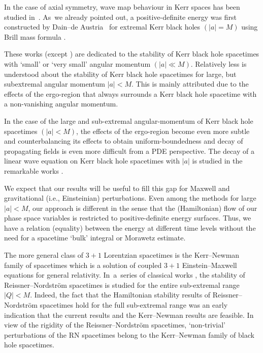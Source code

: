 In the case of axial symmetry, wave map behaviour in Kerr spaces has been studied in~\cite{IK_15}. As~we already pointed out, a positive-definite energy was first constructed by Dain--de Austria~\cite{DA_14} for extremal Kerr black holes $(\vert a \vert =M)$ using Brill mass formula \cite{B59, D09}.

 These works (except \cite{DA_14}) are dedicated to the stability of Kerr black hole spacetimes with `small' or `very small' angular momentum $(\vert a \vert \ll M)$. Relatively less is understood about the stability of Kerr black hole spacetimes for large, but subextremal angular momentum $ \vert a \vert<M$. This is mainly attributed due to the effects of the ergo-region that always surrounds a Kerr black hole spacetime with a non-vanishing angular momentum.

In the case of the large and sub-extremal angular-momentum of Kerr black hole spacetimes $ (\vert a \vert <M)$, the effects of the ergo-region become even more subtle and counterbalancing its effects to obtain uniform-boundedness and decay of propagating fields is even more difficult from a PDE perspective.
The decay of a linear wave equation on Kerr black hole spacetimes with $\vert a \vert$ is studied in the remarkable works \cite{DRS_16, FKSY_05,FKSY_06,FKSY_08}.

 We expect that our results will be useful to fill this gap for Maxwell and gravitational (i.e., Einsteinian) perturbations. Even among the methods for large $\vert a \vert<M$, our approach is different in the sense that the (Hamiltonian) flow of our phase space variables is restricted to positive-definite energy surfaces. Thus, we have a relation (equality) between the energy at different time levels without the need for a spacetime `bulk' integral or Morawetz estimate.

The more general class of $3+1$ Lorentzian spacetimes is the Kerr--Newman family of spacetimes which is a solution of coupled $3+1$ Einstein--Maxwell equations for general relativity. In~a~series of classical works \cite{Moncrief_74_1,Moncrief_74_2,Moncrief_74_3}, the stability of Reissner--Nordstr\"om spacetimes is studied for the entire sub-extremal range $\vert Q \vert <M$. Indeed, the fact that the Hamiltonian stability results of Reissner--Nordstr\"om spacetimes hold for the full sub-extremal range was an early indication that the current results and the Kerr--Newman results \cite{GM17_gentitle} are feasible. In view of the rigidity of the Reissner--Nordstr\"om spacetimes, `non-trivial' perturbations of the RN spacetimes belong to the Kerr--Newman family of black hole spacetimes.

